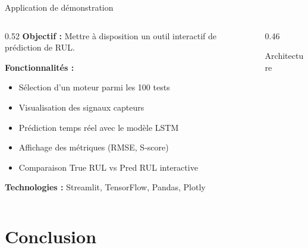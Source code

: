 \documentclass[aspectratio=169,11pt]{beamer}
\begin{document}
\begin{frame}{Application de démonstration}
\begin{columns}[T]
\begin{column}{0.52\textwidth}
\textbf{Objectif :} Mettre à disposition un outil interactif de prédiction de RUL.
\vspace{0.3cm}

\textbf{Fonctionnalités :}
\begin{itemize}
    \item Sélection d'un moteur parmi les 100 tests
    \item Visualisation des signaux capteurs
    \item Prédiction temps réel avec le modèle LSTM
    \item Affichage des métriques (RMSE, S-score)
    \item Comparaison True RUL vs Pred RUL interactive
\end{itemize}
\vspace{0.3cm}
\textbf{Technologies :} Streamlit, TensorFlow, Pandas, Plotly
\end{column}
\begin{column}{0.46\textwidth}
\begin{block}{Architecture}
\centering
{}
\end{block}
\end{column}
\end{columns}
\end{frame}

\section{Conclusion}
\end{document}
